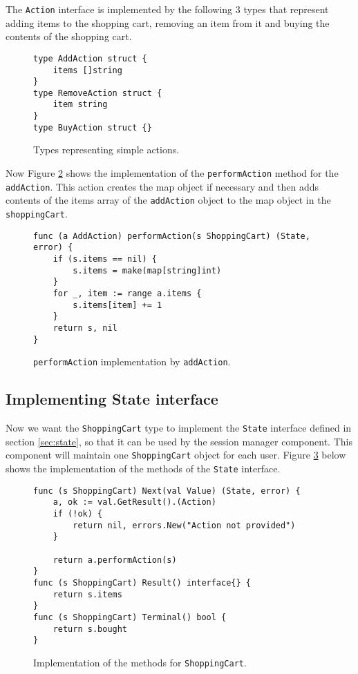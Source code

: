The \texttt{Action} interface is implemented by the following 3 types
that represent adding items to the shopping cart, removing an item from it
and buying the contents of the shopping cart.
\begin{figure}[h]
\begin{lstlisting}
type AddAction struct {
    items []string
}
type RemoveAction struct {
    item string
}
type BuyAction struct {}
\end{lstlisting}
\caption[scale=1.0]{Types representing simple actions.}
\label{fig:actions}
\end{figure}

Now Figure \ref{fig:addAction} shows the implementation of the \texttt{performAction}
method for the \texttt{addAction}. This action creates the map object if necessary and
then adds contents of the items array of the \texttt{addAction} object to the map
object in the \texttt{shoppingCart}.
\begin{figure}[h]
\begin{lstlisting}
func (a AddAction) performAction(s ShoppingCart) (State, error) {
    if (s.items == nil) {
        s.items = make(map[string]int)
    }
    for _, item := range a.items {
        s.items[item] += 1
    }
    return s, nil
}
\end{lstlisting}
\caption[scale=1.0]{\texttt{performAction} implementation by \texttt{addAction}.}
\label{fig:addAction}
\end{figure}

\subsection{Implementing State interface}
Now we want the \texttt{ShoppingCart} type to implement the \texttt{State} 
interface defined in section
\ref{sec:state}, so that it can be used by the session manager component.
This component will maintain one \texttt{ShoppingCart} object for each user.
Figure \ref{fig:shoppingCartImpl} below shows the implementation of the 
methods of the \texttt{State} interface.
\begin{figure}[h]
\begin{lstlisting}
func (s ShoppingCart) Next(val Value) (State, error) {
    a, ok := val.GetResult().(Action)
    if (!ok) {
        return nil, errors.New("Action not provided")
    }

    return a.performAction(s)
}
func (s ShoppingCart) Result() interface{} {
    return s.items
}
func (s ShoppingCart) Terminal() bool {
    return s.bought
}
\end{lstlisting}
\caption[scale=1.0]{Implementation of the methods for \texttt{ShoppingCart}.}
\label{fig:shoppingCartImpl}
\end{figure}

